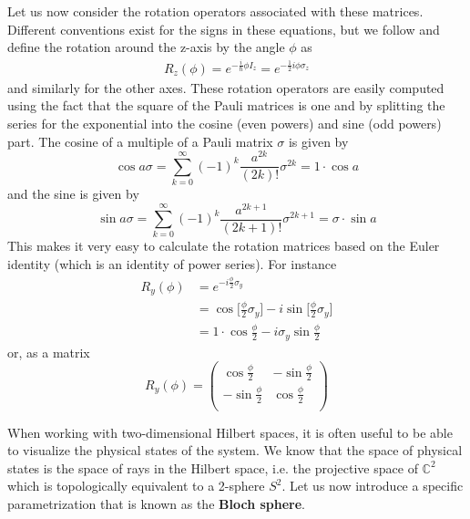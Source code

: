 \documentclass[a4paper, draft]{article}
\theoremstyle{own}
\theoremstyle{remark}
\newcommand{\C}{\mathbb{C}}
\begin{document}
Let us now consider the rotation operators associated with these matrices. Different conventions exist for the signs in these equations, but we follow \cite{Levitt} and define the rotation around the z-axis by the angle $\phi$ as 
\begin{align}
\label{eq:rotationzaxis}
R_z(\phi) = e^{-\frac{i}{\hbar}\phi I_z} = e^{-\frac{1}{2} i \phi \sigma_z}
\end{align}
and similarly for the other axes. These rotation operators are easily computed using the fact that the square of the Pauli matrices is one and by splitting the series for the exponential into the cosine (even powers) and sine (odd powers) part. The cosine of a multiple of a Pauli matrix $\sigma$ is given by
$$
\cos a \sigma = \sum_{k=0}^\infty (-1)^k \frac{a^{2k}}{(2k)!} \sigma^{2k} = 1 \cdot \cos a
$$
and the sine is given by
$$
\sin a \sigma = \sum_{k=0}^\infty (-1)^k \frac{a^{2k+1}}{(2k+1)!} \sigma^{2k+1} = \sigma \cdot \sin a
$$
This makes it very easy to calculate the rotation matrices based on the Euler identity (which is an identity of power series). For instance
\begin{align*}
R_y(\phi) &=  e^{-i \frac{\phi}{2}   \sigma_y} \\
&= \cos \big[ \frac{\phi}{2} \sigma_y \big] - i \sin \big[  \frac{\phi}{2} \sigma_y \big] \\
&= 1 \cdot \cos \frac{\phi}{2} - i \sigma_y \sin \frac{\phi}{2}
\end{align*}
or, as a matrix
$$
R_y(\phi) = 
\begin{pmatrix}
\cos \frac{\phi}{2} & - \sin \frac{\phi}{2} \\
 - \sin \frac{\phi}{2} & \cos \frac{\phi}{2} \\
\end{pmatrix}
$$

When working with two-dimensional Hilbert spaces, it is often useful to be able to visualize the physical states of the system. We know that the space of physical states is the space of rays in the Hilbert space, i.e. the projective space of $\C^2$ which is topologically equivalent to a 2-sphere $S^2$. Let us now introduce a specific parametrization that is known as the {\bf Bloch sphere}.
\end{document}
